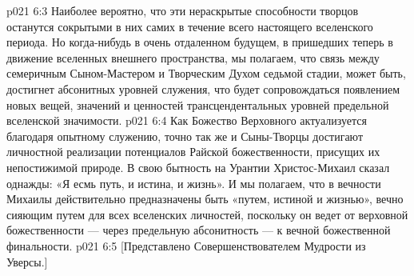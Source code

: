 \vs p021 6:3 Наиболее вероятно, что эти нераскрытые способности творцов останутся сокрытыми в них самих в течение всего настоящего вселенского периода. Но когда\hyp{}нибудь в очень отдаленном будущем, в пришедших теперь в движение вселенных внешнего пространства, мы полагаем, что связь между семеричным Сыном\hyp{}Мастером и Творческим Духом седьмой стадии, может быть, достигнет абсонитных уровней служения, что будет сопровождаться появлением новых вещей, значений и ценностей трансцендентальных уровней предельной вселенской значимости.
\vs p021 6:4 Как Божество Верховного актуализуется благодаря опытному служению, точно так же и Сыны\hyp{}Творцы достигают личностной реализации потенциалов Райской божественности, присущих их непостижимой природе. В свою бытность на Урантии Христос\hyp{}Михаил сказал однажды: «Я есмь путь, и истина, и жизнь». И мы полагаем, что в вечности Михаилы действительно предназначены быть «путем, истиной и жизнью», вечно сияющим путем для всех вселенских личностей, поскольку он ведет от верховной божественности --- через предельную абсонитность --- к вечной божественной финальности.
\vs p021 6:5 [Представлено Совершенствователем Мудрости из Уверсы.]
